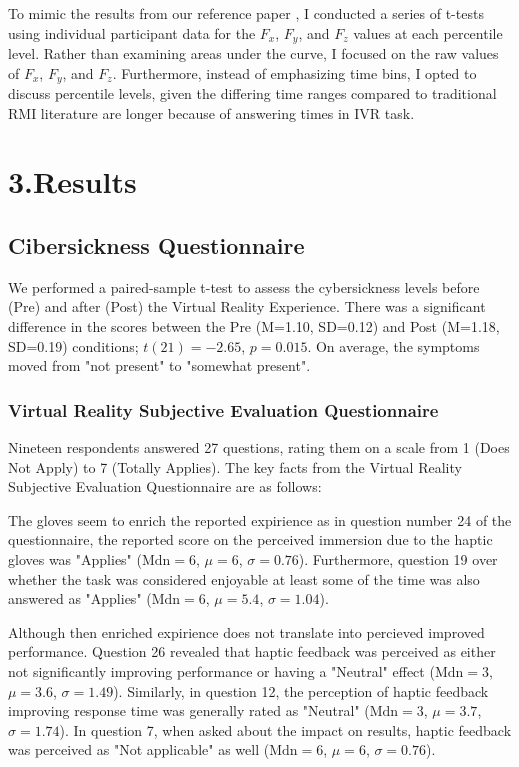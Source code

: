 \documentclass[12pt,oneside,openright]{report}
\begin{document}
To mimic the results from our reference paper \Cite{SALTAFOSSI2023108642}, I conducted a series of t-tests using individual participant data for the $F_x$, $F_y$, and $F_z$ values at each percentile level. Rather than examining areas under the curve, I focused on the raw values of $F_x$, $F_y$, and $F_z$. Furthermore, instead of emphasizing time bins, I opted to discuss percentile levels, given the differing time ranges compared to traditional RMI literature are longer because of answering times in IVR task.

\section*{3.Results}
\subsection*{Cibersickness Questionnaire}
 
We performed a paired-sample t-test to assess the cybersickness levels before (Pre) and after (Post) the Virtual Reality Experience. There was a significant difference in the scores between the Pre (M=1.10, SD=0.12) and Post (M=1.18, SD=0.19) conditions; $t(21)=-2.65$, $p = 0.015$. On average, the symptoms moved from "not present" to "somewhat present". 

\subsubsection*{Virtual Reality Subjective Evaluation Questionnaire}
Nineteen respondents answered 27 questions, rating them on a scale from 1 (Does Not Apply) to 7 (Totally Applies). The key facts from the Virtual Reality Subjective Evaluation Questionnaire are as follows:
    
The gloves seem to enrich the reported expirience as in question number 24 of the questionnaire, the reported score on the perceived immersion due to the haptic gloves was "Applies" ($\text{Mdn} = 6$, $\mu = 6$, $\sigma = 0.76$). Furthermore, question 19 over whether the task was considered enjoyable at least some of the time was also answered as "Applies" ($\text{Mdn} = 6$, $\mu = 5.4$, $\sigma = 1.04$).
        
Although then enriched expirience does not translate into percieved improved performance. Question 26 revealed that haptic feedback was perceived as either not significantly improving performance or having a "Neutral" effect ($\text{Mdn} = 3$, $\mu = 3.6$, $\sigma = 1.49$). Similarly, in question 12, the perception of haptic feedback improving response time was generally rated as "Neutral" ($\text{Mdn} = 3$, $\mu = 3.7$, $\sigma = 1.74$). In question 7, when asked about the impact on results, haptic feedback was perceived as "Not applicable" as well ($\text{Mdn} = 6$, $\mu = 6$, $\sigma = 0.76$).
    
\end{document}
